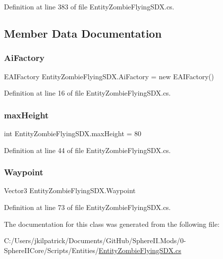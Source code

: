 Definition at line 383 of file Entity\+Zombie\+Flying\+S\+D\+X.\+cs.



\subsection{Member Data Documentation}
\mbox{\label{class_entity_zombie_flying_s_d_x_a8ae18dc9f20b77748ada6e7b98affcd2}} 
\subsubsection{\texorpdfstring{AiFactory}{AiFactory}}
{\footnotesize\ttfamily E\+A\+I\+Factory Entity\+Zombie\+Flying\+S\+D\+X.\+Ai\+Factory = new E\+A\+I\+Factory()\hspace{0.3cm}{\ttfamily [static]}}



Definition at line 16 of file Entity\+Zombie\+Flying\+S\+D\+X.\+cs.

\mbox{\label{class_entity_zombie_flying_s_d_x_a50fb6a430711859830cce96d5f26ec90}} 
\subsubsection{\texorpdfstring{maxHeight}{maxHeight}}
{\footnotesize\ttfamily int Entity\+Zombie\+Flying\+S\+D\+X.\+max\+Height = 80}



Definition at line 44 of file Entity\+Zombie\+Flying\+S\+D\+X.\+cs.

\mbox{\label{class_entity_zombie_flying_s_d_x_a0156e326cea7efd4dbf5b0dd7a0f0daf}} 
\subsubsection{\texorpdfstring{Waypoint}{Waypoint}}
{\footnotesize\ttfamily Vector3 Entity\+Zombie\+Flying\+S\+D\+X.\+Waypoint}



Definition at line 73 of file Entity\+Zombie\+Flying\+S\+D\+X.\+cs.



The documentation for this class was generated from the following file\+:\begin{DoxyCompactItemize}
\item 
C\+:/\+Users/jkilpatrick/\+Documents/\+Git\+Hub/\+Sphere\+I\+I.\+Mods/0-\/\+Sphere\+I\+I\+Core/\+Scripts/\+Entities/\mbox{\hyperlink{_entity_zombie_flying_s_d_x_8cs}{Entity\+Zombie\+Flying\+S\+D\+X.\+cs}}\end{DoxyCompactItemize}
